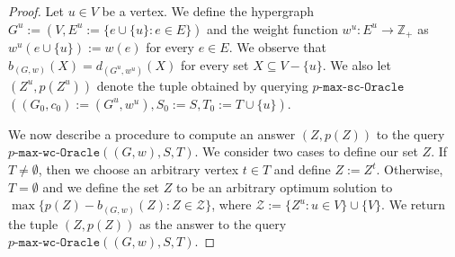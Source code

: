 \documentclass{article}
\newcommand{\functionMaximizationOracle}[1]{\ensuremath{{#1}\text{-}\mathtt{max}\text{-}\mathtt{wc}\text{-}\mathtt{Oracle}}\xspace}
\newcommand{\functionMaximizationOracleStrongCover}[1]{\ensuremath{{#1}\text{-}\mathtt{max}\text{-}\mathtt{sc}\text{-}\mathtt{Oracle}}\xspace}
\providecommand{\Z}{\mathbb{Z}}
\providecommand{\calZ}{\mathcal{Z}}
\begin{document}
\begin{proof}
Let $u \in V$ be a vertex. We define the hypergraph $G^u := (V, E^u := \{e \cup \{u\} : e \in E\})$ and the weight function $w^u : E^u \rightarrow\Z_+$ as $w^u(e \cup \{u\}) := w(e)$ for every $e \in E$. We observe that $b_{(G, w)}(X) = d_{(G^u, w^u)}(X)$ for every set $X \subseteq V - \{u\}$. We also let $(Z^u, p(Z^u))$ denote the tuple obtained by querying \functionMaximizationOracleStrongCover{p}$((G_0, c_0) := (G^u, w^u), S_0 := S, T_0 := T\cup \{u\})$.

We now describe a procedure to compute an answer $(Z, p(Z))$ to the query $\functionMaximizationOracle{p}((G,w), S, T)$. We consider two cases to define our set $Z$. If $T \not= \emptyset$, then we choose an arbitrary vertex $t \in T$ and define $Z := Z^t$. Otherwise, $T = \emptyset$ and we define the set $Z$ to be an arbitrary optimum solution to $\max\{p(Z) - b_{(G, w)}(Z) : Z \in \calZ \}$, where $\calZ := \{Z^u: u \in V\} \cup \{ V\}$.  We return the tuple $(Z, p(Z))$ as the answer to the query $\functionMaximizationOracle{p}((G, w), S, T)$.


\end{proof}
\end{document}
